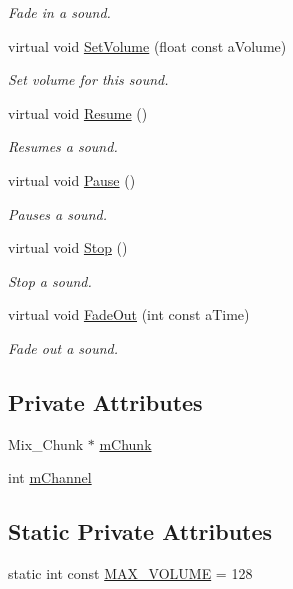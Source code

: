 \begin{DoxyCompactItemize}
\begin{DoxyCompactList}\small\item\em Fade in a sound. \end{DoxyCompactList}\item 
virtual void \hyperlink{classPCSound_adc92d40c216b0b71b61c8c0166b99208}{Set\+Volume} (float const a\+Volume)
\begin{DoxyCompactList}\small\item\em Set volume for this sound. \end{DoxyCompactList}\item 
virtual void \hyperlink{classPCSound_ae7955f15d57a21e7631569ba8216332e}{Resume} ()
\begin{DoxyCompactList}\small\item\em Resumes a sound. \end{DoxyCompactList}\item 
virtual void \hyperlink{classPCSound_a8014ffd1aa852e744cb2388b889ae9de}{Pause} ()
\begin{DoxyCompactList}\small\item\em Pauses a sound. \end{DoxyCompactList}\item 
virtual void \hyperlink{classPCSound_a9e7787c4a29f570250d79f4d41fea651}{Stop} ()
\begin{DoxyCompactList}\small\item\em Stop a sound. \end{DoxyCompactList}\item 
virtual void \hyperlink{classPCSound_ab8014c5286bf495ee6d57bee683a633a}{Fade\+Out} (int const a\+Time)
\begin{DoxyCompactList}\small\item\em Fade out a sound. \end{DoxyCompactList}\end{DoxyCompactItemize}
\subsection*{Private Attributes}
\begin{DoxyCompactItemize}
\item 
Mix\+\_\+\+Chunk $\ast$ \hyperlink{classPCSound_a83c8c539e699f4e9b4ff97e11a411f4c}{m\+Chunk}
\item 
int \hyperlink{classPCSound_a77ac270d52beadac024b677bd566b2b7}{m\+Channel}
\end{DoxyCompactItemize}
\subsection*{Static Private Attributes}
\begin{DoxyCompactItemize}
\item 
static int const \hyperlink{classPCSound_a7f6381192fc1f185fe6e77ff567cfcfa}{M\+A\+X\+\_\+\+V\+O\+L\+U\+ME} = 128
\end{DoxyCompactItemize}
